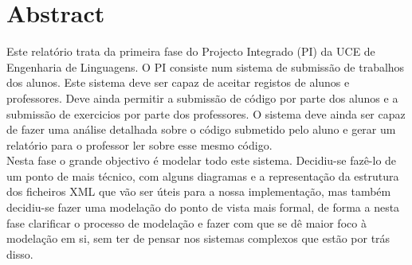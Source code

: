 \thispagestyle{plain}
\chapter*{Abstract}

Este relatório trata da primeira fase do Projecto Integrado (PI) da UCE de Engenharia de Linguagens. O PI consiste num sistema
de submissão de trabalhos dos alunos. Este sistema deve ser capaz de aceitar registos de alunos e professores. Deve ainda permitir a submissão
de código por parte dos alunos e a submissão de exercicios por parte dos professores. O sistema deve ainda ser capaz de fazer uma análise detalhada
sobre o código submetido pelo aluno e gerar um relatório para o professor ler sobre esse mesmo código.\\

Nesta fase o grande objectivo é modelar todo este sistema. Decidiu-se fazê-lo de um ponto de mais técnico, com alguns diagramas e a representação da estrutura dos ficheiros XML que vão
ser úteis para a nossa implementação, mas também decidiu-se fazer uma modelação do ponto de vista mais formal, de forma a nesta fase clarificar o processo de
modelação e fazer com que se dê maior foco à modelação em si, sem ter de pensar nos sistemas complexos que estão por trás disso.

